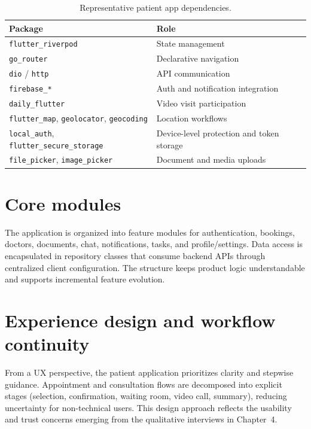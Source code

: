 \documentclass[11pt,a4paper,twoside,openany,headings=normal]{scrreprt}
\begin{document}
\begin{table}[htbp]
\centering
\caption{Representative patient app dependencies.}
\label{tab:patient-deps}
\begin{tabularx}{\textwidth}{@{}l>{\RaggedRight\arraybackslash}X@{}}
\toprule
\textbf{Package} & \textbf{Role} \\
\midrule
\texttt{flutter\_riverpod} & State management \\
\texttt{go\_router} & Declarative navigation \\
\texttt{dio} / \texttt{http} & API communication \\
\texttt{firebase\_*} & Auth and notification integration \\
\texttt{daily\_flutter} & Video visit participation \\
\texttt{flutter\_map}, \texttt{geolocator}, \texttt{geocoding} & Location workflows \\
\texttt{local\_auth}, \texttt{flutter\_secure\_storage} & Device-level protection and token storage \\
\texttt{file\_picker}, \texttt{image\_picker} & Document and media uploads \\
\bottomrule
\end{tabularx}
\end{table}

\section{Core modules}

The application is organized into feature modules for authentication, bookings, doctors, documents, chat, notifications, tasks, and profile/settings. Data access is encapsulated in repository classes that consume backend APIs through centralized client configuration. The structure keeps product logic understandable and supports incremental feature evolution.

\section{Experience design and workflow continuity}

From a UX perspective, the patient application prioritizes clarity and stepwise guidance. Appointment and consultation flows are decomposed into explicit stages (selection, confirmation, waiting room, video call, summary), reducing uncertainty for non-technical users. This design approach reflects the usability and trust concerns emerging from the qualitative interviews in Chapter~4.
\end{document}
